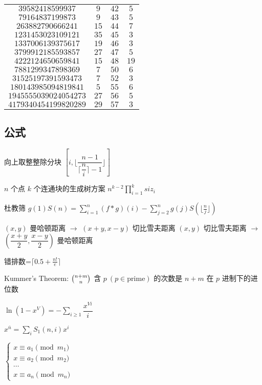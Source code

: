 \documentclass[12pt]{ctexart}
\begin{document}
\begin{tabular}{c|c|c|c}
	$39582418599937$    &  $9$  & $42$ &  $5$  \\
	$79164837199873$    &  $9$  & $43$ &  $5$  \\
	$263882790666241$   & $15$  & $44$ &  $7$  \\
   $1231453023109121$   & $35$  & $45$ &  $3$  \\
   $1337006139375617$   & $19$  & $46$ &  $3$  \\
   $3799912185593857$   & $27$  & $47$ &  $5$  \\
   $4222124650659841$   & $15$  & $48$ & $19$  \\
   $7881299347898369$   &  $7$  & $50$ &  $6$  \\
   $31525197391593473$  &  $7$  & $52$ &  $3$  \\
  $180143985094819841$  &  $5$  & $55$ &  $6$  \\
  $1945555039024054273$ & $27$  & $56$ &  $5$  \\
  $4179340454199820289$ & $29$  & $57$ &  $3$  \\
 \end{tabular}

\subsection{公式}

向上取整整除分块 $[i,\lfloor\dfrac{n-1}{\lceil\dfrac ni \rceil-1}\rfloor]$

$n$ 个点 $k$ 个连通块的生成树方案 $n^{k-2}\prod\limits_{i=1}^k siz_i$

杜教筛 $g(1)S(n)=\sum\limits_{i=1}^n(f*g)(i)-\sum\limits_{j=2}^ng(j)S(\lfloor\frac nj\rfloor)$

$(x,y)$ 曼哈顿距离 $\to$ $(x+y,x-y)$ 切比雪夫距离  
$(x,y)$ 切比雪夫距离 $\to$ $(\dfrac{x+y}{2},\dfrac{x-y}{2})$ 曼哈顿距离

错排数=$\lceil0.5+\frac{n!}{e}\rceil$

Kummer's Theorem: $\tbinom{n+m}{n}$ 含 $p~(p\in \text {prime})$ 的次数是 $n+m$ 在 $p$ 进制下的进位数

$\ln (1-x^V)=-\sum\limits_{i\ge1}\dfrac{x^{Vi}}{i}$

$x^{\bar n}=\sum\limits_i S_1(n,i)x^i$

$\begin{cases}x\equiv a_1\pmod {m_1}\\x\equiv a_2\pmod {m_2}\\\cdots\\x\equiv a_n\pmod {m_n}\end{cases}$ 
\end{document}
